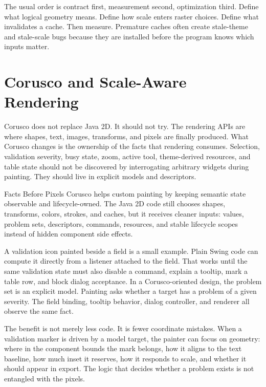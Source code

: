 The usual order is contract first, measurement second, optimization third. Define what logical geometry means. Define how scale enters raster choices. Define what invalidates a cache. Then measure. Premature caches often create stale-theme and stale-scale bugs because they are installed before the program knows which inputs matter.

\section{Corusco and Scale-Aware Rendering}

Corusco does not replace Java 2D. It should not try. The rendering APIs are where shapes, text, images, transforms, and pixels are finally produced. What Corusco changes is the ownership of the facts that rendering consumes. Selection, validation severity, busy state, zoom, active tool, theme-derived resources, and table state should not be discovered by interrogating arbitrary widgets during painting. They should live in explicit models and descriptors.

\begin{coruscobox}{Facts Before Pixels}
Corusco helps custom painting by keeping semantic state observable and lifecycle-owned. The Java 2D code still chooses shapes, transforms, colors, strokes, and caches, but it receives cleaner inputs: values, problem sets, descriptors, commands, resources, and stable lifecycle scopes instead of hidden component side effects.
\end{coruscobox}

A validation icon painted beside a field is a small example. Plain Swing code can compute it directly from a listener attached to the field. That works until the same validation state must also disable a command, explain a tooltip, mark a table row, and block dialog acceptance. In a Corusco-oriented design, the problem set is an explicit model. Painting asks whether a target has a problem of a given severity. The field binding, tooltip behavior, dialog controller, and renderer all observe the same fact.

The benefit is not merely less code. It is fewer coordinate mistakes. When a validation marker is driven by a model target, the painter can focus on geometry: where in the component bounds the mark belongs, how it aligns to the text baseline, how much inset it reserves, how it responds to scale, and whether it should appear in export. The logic that decides whether a problem exists is not entangled with the pixels.

